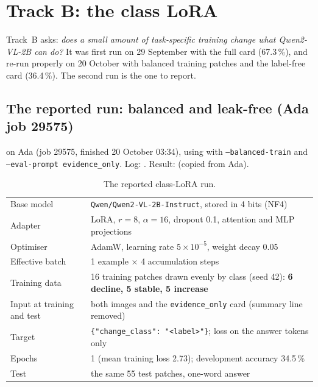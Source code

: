 \chapter{Track B: the class LoRA}
\label{ch:trackB}

Track~B asks: \emph{does a small amount of task-specific training change what Qwen2-VL-2B can do?} It was first run on 29 September with the full card (67.3\,\%), and re-run properly on 20 October with balanced training patches and the label-free card (36.4\,\%). The second run is the one to report.

\section{The reported run: balanced and leak-free (Ada job 29575)}

\begin{wherecode}
 on Ada (job 29575, finished 20 October 03:34), using  with \texttt{--balanced-train} and \texttt{--eval-prompt evidence\_only}. Log: . Result:  (copied from Ada).
\end{wherecode}

\begin{table}[H]
\centering
\caption{The reported class-LoRA run.}
\label{tab:classlora}
\small
\begin{tabularx}{\textwidth}{lY}
\toprule
Base model & \texttt{Qwen/Qwen2-VL-2B-Instruct}, stored in 4 bits (NF4) \\
Adapter & LoRA, $r = 8$, $\alpha = 16$, dropout 0.1, attention and MLP projections \\
Optimiser & AdamW, learning rate $5\times10^{-5}$, weight decay 0.05 \\
Effective batch & 1 example $\times$ 4 accumulation steps \\
Training data & 16 training patches drawn evenly by class (seed 42): \textbf{6 decline, 5 stable, 5 increase} \\
Input at training and test & both images and the \texttt{evidence\_only} card (summary line removed) \\
Target & \texttt{\{"change\_class": "<label>"\}}; loss on the answer tokens only \\
Epochs & 1 (mean training loss 2.73); development accuracy 34.5\,\% \\
Test & the same 55 test patches, one-word answer \\
\bottomrule
\end{tabularx}
\end{table}

